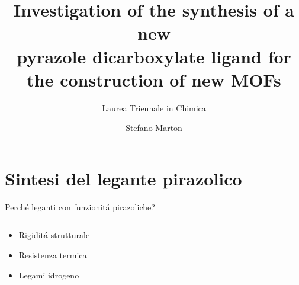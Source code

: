 \documentclass[aspectration=169]{beamer}
\title{\large{Investigation of the synthesis of a new \\ pyrazole dicarboxylate ligand for the construction of new MOFs}}
\subtitle{Laurea Triennale in Chimica}
\author{\href{stefano.marton@studenti.unimi.it}{Stefano Marton}}
\begin{document}
\maketitle

\section{Sintesi del legante pirazolico}

\setlength{\columnsep}{0.2cm}
\begin{frame}{Perché leganti con funzionitá pirazoliche?}
	\begin{columns}
		\hspace{1cm}
		\begin{column}{0.3\textwidth}
			\begin{itemize}
				\item Rigiditá strutturale
				\item Resistenza termica
				\item Legami idrogeno
			\end{itemize}
		\end{column}

\end{columns}
\end{frame}
\end{document}
